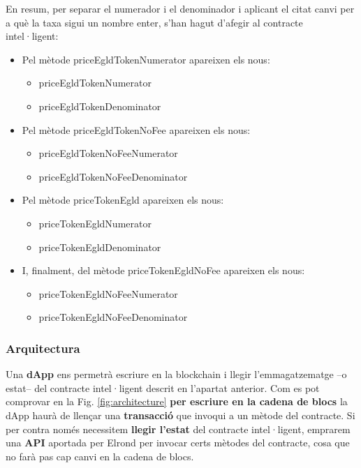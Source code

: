 \documentclass[11pt,a4paper]{article}
\begin{document}
En resum, per separar el numerador i el denominador i aplicant el citat canvi per a què la taxa sigui un nombre enter, s'han hagut d'afegir al contracte intel·ligent:
\begin{itemize}
\item Pel mètode priceEgldTokenNumerator apareixen els nous:
	\begin{itemize}
		\item priceEgldTokenNumerator
		\item priceEgldTokenDenominator
	\end{itemize}
\item Pel mètode priceEgldTokenNoFee apareixen els nous:
	\begin{itemize}
		\item priceEgldTokenNoFeeNumerator
		\item priceEgldTokenNoFeeDenominator
	\end{itemize}	
\item Pel mètode priceTokenEgld apareixen els nous:
	\begin{itemize}
		\item priceTokenEgldNumerator
		\item priceTokenEgldDenominator
	\end{itemize}
\item I, finalment, del mètode priceTokenEgldNoFee apareixen els nous:
	\begin{itemize}
		\item priceTokenEgldNoFeeNumerator
		\item priceTokenEgldNoFeeDenominator
	\end{itemize}		
\end{itemize}

\subsubsection{Arquitectura}\label{subsub:arq}

Una \textbf{dApp} ens permetrà escriure en la blockchain i llegir l'emmagatzematge –o estat– del contracte intel·ligent descrit en l'apartat anterior. Com es pot comprovar en la Fig. \ref{fig:architecture} \textbf{per escriure en la cadena de blocs} la dApp haurà de llençar una \textbf{transacció} que invoqui a un mètode del contracte. Si per contra només necessitem \textbf{llegir l'estat} del contracte intel·ligent, emprarem una \textbf{API} aportada per Elrond per invocar certs mètodes del contracte, cosa que no farà pas cap canvi en la cadena de blocs.
\end{document}
